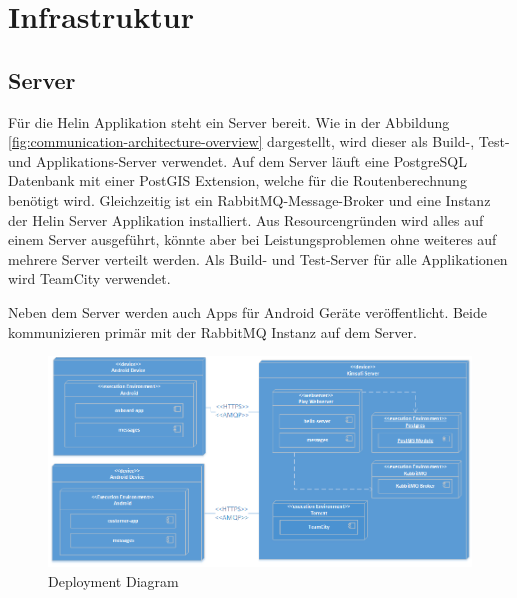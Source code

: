 \newpage

\chapter{Infrastruktur}

\section{Server}

Für die Helin Applikation steht ein Server bereit. Wie in der Abbildung \ref{fig:communication-architecture-overview} dargestellt, wird dieser als Build-, Test- und Applikations-Server verwendet. 
Auf dem Server läuft eine PostgreSQL Datenbank mit einer PostGIS Extension, welche für die Routenberechnung benötigt wird. Gleichzeitig ist ein RabbitMQ-Message-Broker und eine Instanz der Helin Server Applikation installiert. Aus Resourcengründen wird alles auf einem Server ausgeführt, könnte aber bei Leistungsproblemen ohne weiteres auf mehrere Server verteilt werden. Als Build- und Test-Server für alle Applikationen wird TeamCity verwendet. 

Neben dem Server werden auch Apps für Android Geräte veröffentlicht. Beide kommunizieren primär mit der RabbitMQ Instanz auf dem Server.

\begin{figure}[h]
	\includegraphics[width=1.0\textwidth]{images/DeploymentDiagram.png}
	\caption{Deployment Diagram}
	\label{fig:deployment-diagram}
\end{figure}


